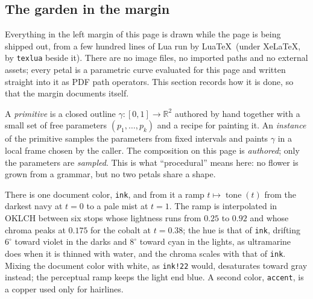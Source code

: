 \setcounter{section}{3}\setcounter{subsection}{1}
\subsection{The garden in the margin}

Everything in the left margin of this page is drawn while the page is being shipped out,
from a few hundred lines of Lua run by Lua\TeX\ (under Xe\LaTeX, by \texttt{texlua} beside it). There are no image
files, no imported paths and no external assets; every petal is a parametric curve evaluated for this page
and written straight into it as PDF path operators. This section records how it is done,
so that the margin documents itself.

\begin{definition}
A \emph{primitive} is a closed outline $\gamma\colon[0,1]\to\mathbb{R}^2$ authored by hand
together with a small set of free parameters $(p_1,\dots,p_k)$ and a recipe for painting
it. An \emph{instance} of the primitive samples the parameters from fixed intervals and
paints $\gamma$ in a local frame chosen by the caller. The composition on this page is
\emph{authored}; only the parameters are \emph{sampled}. This is what ``procedural'' means
here: no flower is grown from a grammar, but no two petals share a shape.
\end{definition}

\begin{construction}[Palette]
There is one document color, \texttt{ink}, and from it a ramp $t\mapsto\operatorname{tone}(t)$
from the darkest navy at $t=0$ to a pale mist at $t=1$. The ramp is interpolated in
OKLCH between six stops whose lightness runs from $0.25$ to $0.92$ and whose chroma peaks
at $0.175$ for the cobalt at $t=0.38$; the hue is that of \texttt{ink}, drifting $6^\circ$
toward violet in the darks and $8^\circ$ toward cyan in the lights, as ultramarine does when
it is thinned with water, and the chroma scales with that of \texttt{ink}. Mixing the
document color with white, as \texttt{ink!22} would, desaturates toward gray instead;
the perceptual ramp keeps the light end blue. A second color, \texttt{accent}, is a copper
used only for hairlines.
\end{construction}

